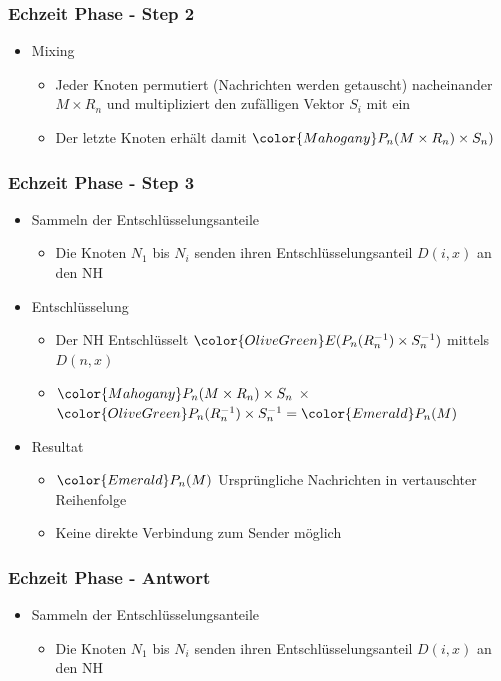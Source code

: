 \documentclass[t, xcolor=dvipsnames]{beamer}
\begin{document}
\begin{frame}
	\frametitle{Echzeit Phase - Step 2}
	\begin{itemize}
		\item Mixing
		\begin{itemize}
			\item Jeder Knoten permutiert (Nachrichten werden getauscht) nacheinander $M \times R_n$ und multipliziert den zufälligen Vektor $S_i$ mit ein
			\item Der letzte Knoten erhält damit $\color{Mahogany}P_n(M \times R_n) \times S_n)$
		\end{itemize}
	\end{itemize}
	\vspace{\fill}
\end{frame}

\begin{frame}
	\frametitle{Echzeit Phase - Step 3}
	\begin{itemize}
		\item Sammeln der Entschlüsselungsanteile
			\begin{itemize}
				\item Die Knoten $N_1$ bis $N_{i}$ senden ihren Entschlüsselungsanteil $D(i,x)$ an den NH
			\end{itemize}

		\item Entschlüsselung
		\begin{itemize}
				\item Der NH Entschlüsselt $\color{OliveGreen} E(P_n(R_n^{-1}) \times S_n^{-1})$ mittels $D(n,x)$
				\item $\color{Mahogany}P_n(M \times R_n) \times S_n$ $\times$ $\color{OliveGreen}P_n(R_n^{-1}) \times S_n^{-1} = \color{Emerald} P_n(M)$
		\end{itemize}

	
	
		\item Resultat
		\begin{itemize}
			\item $\color{Emerald} P_n(M)$ Ursprüngliche Nachrichten in vertauschter Reihenfolge
			\item Keine direkte Verbindung zum Sender möglich
		\end{itemize}
	\end{itemize}		
	\vspace{\fill}
\end{frame}


\begin{frame}
	\frametitle{Echzeit Phase - Antwort}
	\begin{itemize}
		\item Sammeln der Entschlüsselungsanteile
			\begin{itemize}
				\item Die Knoten $N_1$ bis $N_{i}$ senden ihren Entschlüsselungsanteil $D(i,x)$ an den NH
			\end{itemize}
		\end{itemize}
			
	\vspace{\fill}
\end{frame}
\end{document}
